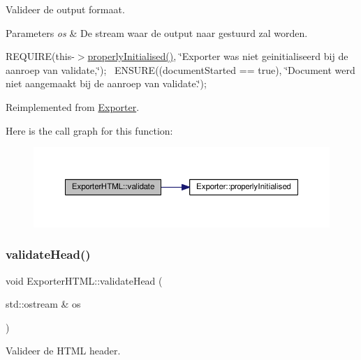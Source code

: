 Valideer de output formaat. 


\begin{DoxyParams}{Parameters}
{\em os} & De stream waar de output naar gestuurd zal worden.\\
\hline
\end{DoxyParams}
R\+E\+Q\+U\+I\+RE(this-\/$>$\hyperlink{class_exporter_aafd9df9210aeefd7bb7fd434fc317cf0}{properly\+Initialised()}, \char`\"{}\+Exporter was niet geinitialiseerd bij de aanroep van validate,\char`\"{});~\newline
E\+N\+S\+U\+RE((document\+Started == true), \char`\"{}\+Document werd niet aangemaakt bij de aanroep van validate.\char`\"{});~\newline


Reimplemented from \hyperlink{class_exporter_a6fe3b356471d7f77502b511b5179a4a8}{Exporter}.

Here is the call graph for this function\+:
\nopagebreak
\begin{figure}[H]
\begin{center}
\leavevmode
\includegraphics[width=350pt]{class_exporter_h_t_m_l_a85662c826df00e13015d8c64325d7fd6_cgraph}
\end{center}
\end{figure}
\mbox{\label{class_exporter_h_t_m_l_a2c8b00996daf897449a15d87fa7c0e13}} 
\subsubsection{\texorpdfstring{validate\+Head()}{validateHead()}}
{\footnotesize\ttfamily void Exporter\+H\+T\+M\+L\+::validate\+Head (\begin{DoxyParamCaption}\item[{std\+::ostream \&}]{os }\end{DoxyParamCaption})}



Valideer de H\+T\+ML header. 



